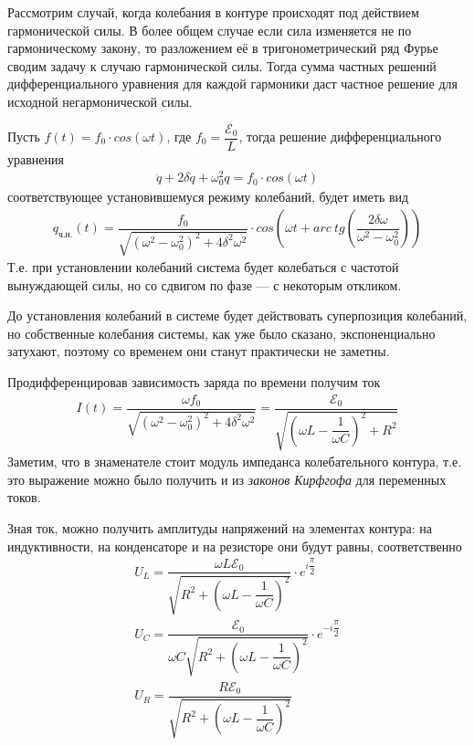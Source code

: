 \documentclass[a4paper, usenames, dvipsnames]{article}
\begin{document}
Рассмотрим случай, когда колебания в контуре происходят под действием гармонической силы.
В более общем случае если сила изменяется не по гармоническому закону,
то разложением её в тригонометрический ряд Фурье сводим задачу к случаю гармонической силы.
Тогда сумма частных решений дифференциального уравнения для каждой гармоники даст частное решение для исходной негармонической силы.

Пусть $f(t) = f_0 \cdot cos(\omega t)$, где $f_0 = \dfrac{\mathcal{E}_0}{L}$, тогда решение дифференциального уравнения
\begin{gather*}
    \ddot{q} + 2\delta \dot{q} + \omega_0^2 q = f_0 \cdot cos(\omega t)
\end{gather*}
соответствующее установившемуся режиму колебаний, будет иметь вид
\begin{gather*}
    q_\text{ч.н.}(t) = \dfrac{f_0}{\sqrt{(\omega^2 - \omega_0^2)^2 + 4\delta^2\omega^2}} \cdot cos\left(\omega t + arc\ tg\left(\dfrac{2\delta\omega}{\omega^2 - \omega_0^2}\right)\right)
\end{gather*}
Т.е. при установлении колебаний система будет колебаться с частотой вынуждающей силы,
но со сдвигом по фазе --- с некоторым откликом.

До установления колебаний в системе будет действовать суперпозиция колебаний,
но собственные колебания системы, как уже было сказано, экспоненциально затухают,
поэтому со временем они станут практически не заметны.

Продифференцировав зависимость заряда по времени получим ток
\begin{gather*}
    I(t) = \dfrac{\omega f_0}{\sqrt{(\omega^2 - \omega_0^2)^2 + 4\delta^2\omega^2}} = \dfrac{\mathcal{E}_0}{\sqrt{\left(\omega L - \dfrac{1}{\omega C}\right)^2 + R^2}}
\end{gather*}
Заметим, что в знаменателе стоит модуль импеданса колебательного контура,
т.е. это выражение можно было получить и из {\it законов Кирфгофа} для переменных токов.

Зная ток, можно получить амплитуды напряжений на элементах контура: на индуктивности,
на конденсаторе и на резисторе они будут равны, соответственно
\begin{gather*}
    U_L = \dfrac{\omega L \mathcal{E}_0}{\sqrt{R^2 + \left(\omega L - \dfrac{1}{\omega C}\right)^2}} \cdot e^{i\dfrac{\pi}{2}} \\
    U_C = \dfrac{\mathcal{E}_0}{\omega C \sqrt{R^2 + \left(\omega L - \dfrac{1}{\omega C}\right)^2}} \cdot e^{-i\dfrac{\pi}{2}} \\
    U_R = \dfrac{R \mathcal{E}_0}{\sqrt{R^2 + \left(\omega L - \dfrac{1}{\omega C}\right)^2}}
\end{gather*}
\end{document}

